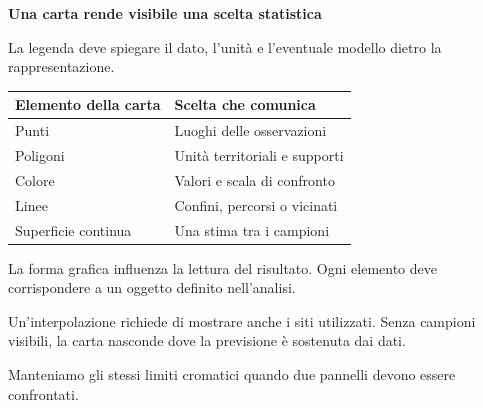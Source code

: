\documentclass[12pt,aspectratio=1610]{beamer}
\newcommand{\PBody}[1]{\par{\fontsize{11.3}{14.8}\selectfont #1\par}}
\newcommand{\PSmall}[1]{\par{\fontsize{9.8}{13.1}\selectfont #1\par}}
\newcommand{\PInfo}[1]{%
\begin{tcolorbox}[enhanced,arc=1.6mm,boxrule=.55pt,colback=GeoTint,
 colframe=Rule!80!Classical,left=2.3mm,right=2.3mm,top=2mm,bottom=2mm,
 before skip=1mm,after skip=1mm]
\PSmall{#1}\end{tcolorbox}}
\begin{document}
\begin{frame}[plain]\hypertarget{slide32}{}
\begin{lrbox}{\TitleBox}
\begin{minipage}[t]{17.7cm}\raggedright\color{Ink}\fontsize{11.3}{14.8}\selectfont
\color{Navy}\bfseries\fontsize{20.6}{24.5}\selectfont Una carta rende visibile una scelta statistica
\end{minipage}\end{lrbox}

\begin{lrbox}{\RecallBox}
\begin{minipage}[t]{14.3cm}\raggedright\color{Ink}\fontsize{11.3}{14.8}\selectfont
\fontsize{10.3}{13.8}\selectfont La legenda deve spiegare il dato, l’unità e l’eventuale modello dietro la rappresentazione.
\end{minipage}\end{lrbox}

\begin{lrbox}{\PilotLeftBox}
\begin{minipage}[t]{10.05cm}\raggedright\color{Ink}\fontsize{11.3}{14.8}\selectfont
{\fontsize{10.2}{13.1}\selectfont\renewcommand{\arraystretch}{1.45}\begin{tabular}{@{}p{3.2cm}p{5.8cm}@{}}\toprule
\textbf{Elemento della carta} & \textbf{Scelta che comunica}\\\midrule
Punti & Luoghi delle osservazioni\\
Poligoni & Unità territoriali e supporti\\
Colore & Valori e scala di confronto\\
Linee & Confini, percorsi o vicinati\\
Superficie continua & Una stima tra i campioni\\
\bottomrule\end{tabular}}

\end{minipage}\end{lrbox}

\begin{lrbox}{\PilotRightBox}
\begin{minipage}[t]{7.55cm}\raggedright\color{Ink}\fontsize{11.3}{14.8}\selectfont
\PBody{La forma grafica influenza la lettura del risultato. Ogni elemento deve corrispondere a un oggetto definito nell’analisi.}
\vspace{2.5mm}
\PInfo{Un’interpolazione richiede di mostrare anche i siti utilizzati. Senza campioni visibili, la carta nasconde dove la previsione è sostenuta dai dati.}
\PBody{Manteniamo gli stessi limiti cromatici quando due pannelli devono essere confrontati.}
\vspace{2.5mm}


\end{minipage}
\end{lrbox}
\end{frame}
\end{document}
